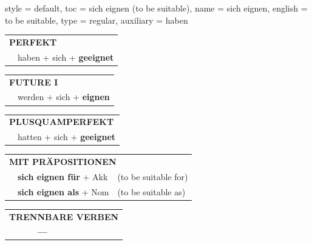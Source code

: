 \begin{verbentry}{
  style = {default},
  toc = {sich eignen (to be suitable)},
  name = {sich eignen},
  english = {to be suitable},
  type = {regular},
  auxiliary = {haben}
}
 \begin{tabular}{rl}
     \multicolumn{2}{l}{\textbf{PERFEKT}}\\
   & haben + sich + \textbf{geeignet}\\
  \end{tabular}
\hfill
   \begin{tabular}{rl}
    \multicolumn{2}{l}{\textbf{FUTURE I} }\\
   & werden + sich + \textbf{eignen}\\
  \end{tabular}
\hfill
   \begin{tabular}{rl}
      \multicolumn{2}{l}{\textbf{PLUSQUAMPERFEKT}}\\
   & hatten + sich + \textbf{geeignet}\\
  \end{tabular}

   \vspace{10pt}

   \begin{tabular}{lll}
      \multicolumn{3}{l}{\textbf{MIT PRÄPOSITIONEN}}\\
& \textbf{sich eignen für} + Akk & (to be suitable for)\\
& \textbf{sich eignen als} + Nom & (to be suitable as)\\
\end{tabular}
  \hfill
   \begin{tabular}{lll}
\multicolumn{3}{l}{\textbf{TRENNBARE VERBEN}}\\
& \textbf{---} & \\
\end{tabular}

  \vspace{-5pt}
\end{verbentry}

